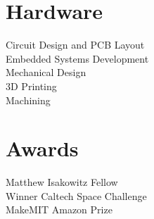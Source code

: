 \documentclass[]{deedy-resume-openfont}
\begin{document}
\begin{minipage}[t]{0.27\textwidth}
\section{\large{Hardware}}
Circuit Design and PCB Layout \\ Embedded Systems Development \\ Mechanical Design \\ 3D Printing \\ Machining





\section{\large{Awards}}
 Matthew Isakowitz Fellow\\
 Winner Caltech Space Challenge \\ MakeMIT Amazon Prize \\




\end{minipage}
\end{document}
